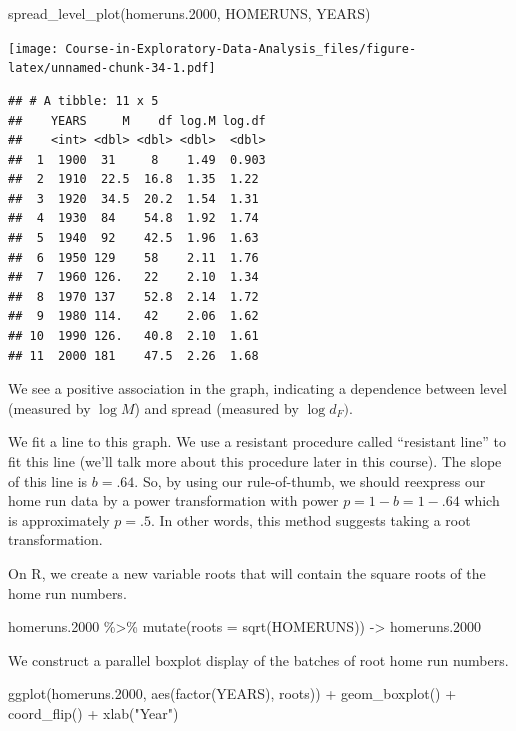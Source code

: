 \documentclass[
]{book}
\newenvironment{Shaded}{\begin{snugshade}}{\end{snugshade}}
\newcommand{\AttributeTok}[1]{\textcolor[rgb]{0.77,0.63,0.00}{#1}}
\newcommand{\FloatTok}[1]{\textcolor[rgb]{0.00,0.00,0.81}{#1}}
\newcommand{\FunctionTok}[1]{\textcolor[rgb]{0.00,0.00,0.00}{#1}}
\newcommand{\NormalTok}[1]{#1}
\newcommand{\OtherTok}[1]{\textcolor[rgb]{0.56,0.35,0.01}{#1}}
\newcommand{\SpecialCharTok}[1]{\textcolor[rgb]{0.00,0.00,0.00}{#1}}
\newcommand{\StringTok}[1]{\textcolor[rgb]{0.31,0.60,0.02}{#1}}
\begin{document}
\begin{Shaded}
\begin{Highlighting}[]
\FunctionTok{spread\_level\_plot}\NormalTok{(homeruns}\FloatTok{.2000}\NormalTok{, HOMERUNS, YEARS)}
\end{Highlighting}
\end{Shaded}

\texttt{[image: Course-in-Exploratory-Data-Analysis\_files/figure-latex/unnamed-chunk-34-1.pdf]}

\begin{verbatim}
## # A tibble: 11 x 5
##    YEARS     M    df log.M log.df
##    <int> <dbl> <dbl> <dbl>  <dbl>
##  1  1900  31     8    1.49  0.903
##  2  1910  22.5  16.8  1.35  1.22 
##  3  1920  34.5  20.2  1.54  1.31 
##  4  1930  84    54.8  1.92  1.74 
##  5  1940  92    42.5  1.96  1.63 
##  6  1950 129    58    2.11  1.76 
##  7  1960 126.   22    2.10  1.34 
##  8  1970 137    52.8  2.14  1.72 
##  9  1980 114.   42    2.06  1.62 
## 10  1990 126.   40.8  2.10  1.61 
## 11  2000 181    47.5  2.26  1.68
\end{verbatim}

We see a positive association in the graph, indicating a dependence between level (measured by \(\log M\)) and spread (measured by \(\log d_F)\).

We fit a line to this graph. We use a resistant procedure called ``resistant line'' to fit this line (we'll talk more about this procedure later in this course). The slope of this line is \(b = .64\). So, by using our rule-of-thumb, we should reexpress our home run data by a power transformation with power \(p = 1 - b = 1 - .64\) which is approximately \(p = .5\). In other words, this method suggests taking a root transformation.

On R, we create a new variable roots that will contain the square roots of the home run numbers.

\begin{Shaded}
\begin{Highlighting}[]
\NormalTok{homeruns}\FloatTok{.2000} \SpecialCharTok{\%\textgreater{}\%} \FunctionTok{mutate}\NormalTok{(}\AttributeTok{roots =} \FunctionTok{sqrt}\NormalTok{(HOMERUNS)) }\OtherTok{{-}\textgreater{}}
\NormalTok{  homeruns}\FloatTok{.2000}
\end{Highlighting}
\end{Shaded}

We construct a parallel boxplot display of the batches of root home run numbers.

\begin{Shaded}
\begin{Highlighting}[]
\FunctionTok{ggplot}\NormalTok{(homeruns}\FloatTok{.2000}\NormalTok{, }\FunctionTok{aes}\NormalTok{(}\FunctionTok{factor}\NormalTok{(YEARS), roots)) }\SpecialCharTok{+}
  \FunctionTok{geom\_boxplot}\NormalTok{() }\SpecialCharTok{+} \FunctionTok{coord\_flip}\NormalTok{() }\SpecialCharTok{+}
  \FunctionTok{xlab}\NormalTok{(}\StringTok{"Year"}\NormalTok{)}
\end{Highlighting}
\end{Shaded}
\end{document}
